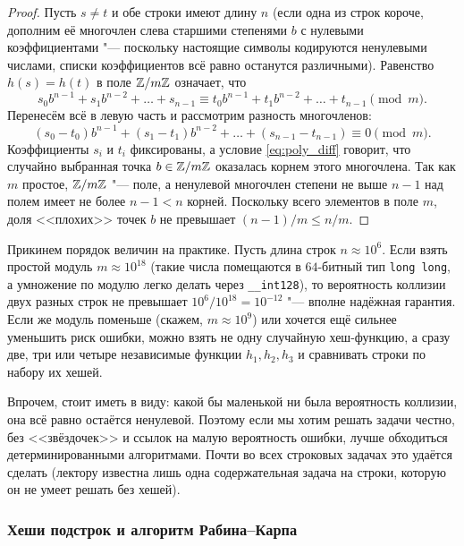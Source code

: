 \begin{proof}
    Пусть $s \ne t$ и обе строки имеют длину $n$ (если одна из строк короче, дополним её многочлен слева старшими степенями $b$ с нулевыми коэффициентами "--- поскольку настоящие символы кодируются ненулевыми числами, списки коэффициентов всё равно останутся различными). Равенство $h(s) = h(t)$ в поле $\mathbb{Z} / m\mathbb{Z}$ означает, что
    \[
        s_0 b^{n-1} + s_1 b^{n-2} + \dots + s_{n-1} \equiv t_0 b^{n-1} + t_1 b^{n-2} + \dots + t_{n-1} \pmod m.
    \]
    Перенесём всё в левую часть и рассмотрим разность многочленов:
    \begin{equation}\label{eq:poly_diff}
        (s_0 - t_0) b^{n-1} + (s_1 - t_1) b^{n-2} + \dots + (s_{n-1} - t_{n-1}) \equiv 0 \pmod m.
    \end{equation}
    Коэффициенты $s_i$ и $t_i$ фиксированы, а условие \eqref{eq:poly_diff} говорит, что случайно выбранная точка $b \in \mathbb{Z} / m\mathbb{Z}$ оказалась корнем этого многочлена. Так как $m$ простое, $\mathbb{Z} / m\mathbb{Z}$ "--- поле, а ненулевой многочлен степени не выше $n - 1$ над полем имеет не более $n - 1 < n$ корней. Поскольку всего элементов в поле $m$, доля <<плохих>> точек $b$ не превышает $(n - 1)/m \le n/m$.
\end{proof}

Прикинем порядок величин на практике. Пусть длина строк $n \approx 10^6$. Если взять простой модуль $m \approx 10^{18}$ (такие числа помещаются в $64$-битный тип \texttt{long long}, а умножение по модулю легко делать через \texttt{\_\_int128}), то вероятность коллизии двух разных строк не превышает $10^6 / 10^{18} = 10^{-12}$ "--- вполне надёжная гарантия. Если же модуль поменьше (скажем, $m \approx 10^9$) или хочется ещё сильнее уменьшить риск ошибки, можно взять не одну случайную хеш-функцию, а сразу две, три или четыре независимые функции $h_1, h_2, h_3$ и сравнивать строки по набору их хешей.

Впрочем, стоит иметь в виду: какой бы маленькой ни была вероятность коллизии, она всё равно остаётся ненулевой. Поэтому если мы хотим решать задачи честно, без <<звёздочек>> и ссылок на малую вероятность ошибки, лучше обходиться детерминированными алгоритмами. Почти во всех строковых задачах это удаётся сделать (лектору известна лишь одна содержательная задача на строки, которую он не умеет решать без хешей).

\subsubsection*{Хеши подстрок и алгоритм Рабина--Карпа}

